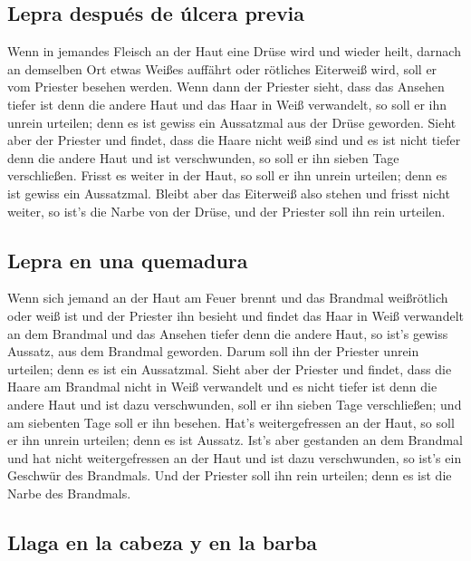\hypertarget{lepra-despuuxe9s-de-uxfalcera-previa}{%
\subsection{Lepra después de úlcera
previa}\label{lepra-despuuxe9s-de-uxfalcera-previa}}

 Wenn in jemandes Fleisch an der Haut eine Drüse wird und
wieder heilt,  darnach an demselben Ort etwas Weißes
auffährt oder rötliches Eiterweiß wird, soll er vom Priester besehen
werden.  Wenn dann der Priester sieht, dass das Ansehen
tiefer ist denn die andere Haut und das Haar in Weiß verwandelt, so soll
er ihn unrein urteilen; denn es ist gewiss ein Aussatzmal aus der Drüse
geworden.  Sieht aber der Priester und findet, dass die
Haare nicht weiß sind und es ist nicht tiefer denn die andere Haut und
ist verschwunden, so soll er ihn sieben Tage verschließen.
 Frisst es weiter in der Haut, so soll er ihn unrein
urteilen; denn es ist gewiss ein Aussatzmal.  Bleibt aber
das Eiterweiß also stehen und frisst nicht weiter, so ist's die Narbe
von der Drüse, und der Priester soll ihn rein urteilen.

\hypertarget{lepra-en-una-quemadura}{%
\subsection{Lepra en una quemadura}\label{lepra-en-una-quemadura}}

 Wenn sich jemand an der Haut am Feuer brennt und das
Brandmal weißrötlich oder weiß ist  und der Priester ihn
besieht und findet das Haar in Weiß verwandelt an dem Brandmal und das
Ansehen tiefer denn die andere Haut, so ist's gewiss Aussatz, aus dem
Brandmal geworden. Darum soll ihn der Priester unrein urteilen; denn es
ist ein Aussatzmal.  Sieht aber der Priester und findet,
dass die Haare am Brandmal nicht in Weiß verwandelt und es nicht tiefer
ist denn die andere Haut und ist dazu verschwunden, soll er ihn sieben
Tage verschließen;  und am siebenten Tage soll er ihn
besehen. Hat's weitergefressen an der Haut, so soll er ihn unrein
urteilen; denn es ist Aussatz.  Ist's aber gestanden an
dem Brandmal und hat nicht weitergefressen an der Haut und ist dazu
verschwunden, so ist's ein Geschwür des Brandmals. Und der Priester soll
ihn rein urteilen; denn es ist die Narbe des Brandmals.

\hypertarget{llaga-en-la-cabeza-y-en-la-barba}{%
\subsection{Llaga en la cabeza y en la
barba}\label{llaga-en-la-cabeza-y-en-la-barba}}

